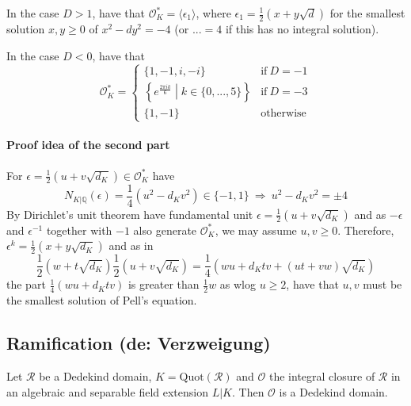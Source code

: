 \documentclass{scrartcl}
\newcommand{\Q}{\mathbb{Q}}
\begin{document}
In the case $D > 1$, have that $\mathcal{O}_K^* = \langle \epsilon_1 \rangle$, where $\epsilon_1 = \frac 1 2 (x + y \sqrt{d})$ for the smallest solution $x, y \geq 0$ of $x^2 - dy^2 = -4$ (or $... = 4$ if this has no integral solution).

In the case $D < 0$, have that 
\begin{equation}
    \mathcal{O}_K^* = \begin{cases}
        \{ 1, -1, i, -i \} & \text{if} \ D = -1 \\
        \left\{ e^{\frac {2\pi i k} 6} \middle| k \in \{0, ..., 5\} \right\} & \text{if} \ D = -3 \\
        \{ 1, -1 \} & \text{otherwise}
    \end{cases} \nonumber
\end{equation}
\paragraph{Proof idea of the second part} For $\epsilon = \frac 1 2 (u + v \sqrt{d_K}) \in \mathcal{O}_K^*$ have
\begin{equation*}
    N_{K|\Q}(\epsilon) = \frac 1 4 (u^2 - d_K v^2) \in \{ -1, 1 \} \ \Rightarrow \ u^2 - d_K v^2 = \pm 4
\end{equation*}
By Dirichlet's unit theorem have fundamental unit $\epsilon = \frac 1 2 (u + v \sqrt{d_K})$ and as $-\epsilon$ and $\epsilon^{-1}$ together with $-1$ also generate $\mathcal{O}_K^*$, we may assume $u, v \geq 0$.
Therefore, $\epsilon^k = \frac 1 2 (x + y\sqrt{d_K})$ and as in
\begin{equation*}
    \frac 1 2 (w + t\sqrt{d_K})\frac 1 2 (u + v \sqrt{d_K}) = \frac 1 4 (wu + d_K tv + (ut + vw)\sqrt{d_K})
\end{equation*}
the part $\frac 1 4 (wu + d_K tv)$ is greater than $\frac 1 2 w$ as wlog $u \geq 2$, have that $u, v$ must be the smallest solution of Pell's equation.

\subsection{Ramification (de: Verzweigung)}
Let $\mathcal{R}$ be a Dedekind domain, $K = \mathrm{Quot}(\mathcal{R})$ and $\mathcal{O}$ the integral closure of $\mathcal{R}$ in an algebraic and separable field extension $L|K$. Then $\mathcal{O}$ is a Dedekind domain.
\end{document}
